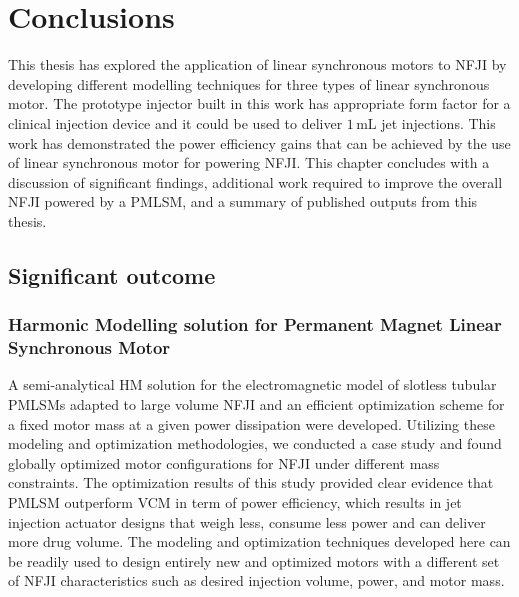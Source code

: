 \chapter{Conclusions}                   \label{Chapter:conclusions}


    This thesis has explored the application of linear synchronous motors to \acf{NFJI} by developing different modelling techniques for three types of linear synchronous motor. The prototype injector built in this work has appropriate form factor for a clinical injection device and it could be used to deliver $1\,\mathrm{mL}$ jet injections. This work has demonstrated the power efficiency gains that can be achieved by the use of linear synchronous motor for powering \acs{NFJI}. This chapter concludes with a discussion of significant findings, additional work required to improve the overall \acs{NFJI} powered by a \acf{PMLSM}, and a summary of published outputs from this thesis.
    

\section{Significant outcome}           \label{Chapter:experiment/significant outcome}
        
        
    \subsection{Harmonic Modelling solution for Permanent Magnet Linear Synchronous Motor}   
        
        A semi-analytical \acf{HM} solution for the electromagnetic model of slotless tubular \acsp{PMLSM} adapted to large volume \acs{NFJI} and an efficient optimization scheme for a fixed motor mass at a given power dissipation were developed. Utilizing these modeling and optimization methodologies,  we conducted a case study and found globally optimized motor configurations for \acs{NFJI} under different mass constraints. The optimization results of this study provided clear evidence that \acs{PMLSM} outperform \acf{VCM} in term of power efficiency, which results in jet injection actuator designs that weigh less, consume less power and can deliver more drug volume. The modeling and optimization techniques developed here can be readily used to design entirely new and optimized motors with a different set of \acs{NFJI} characteristics such as desired injection volume, power, and motor mass.
        

